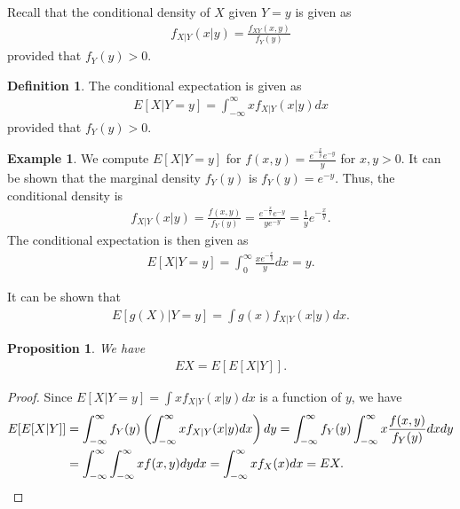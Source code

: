 \documentclass[15pt,a4paper]{book}
\newtheorem{proposition}[theorem]{Proposition}
\theoremstyle{definition}
\newtheorem{definition}[theorem]{Definition}
\newtheorem{example}[theorem]{Example}
\begin{document}
Recall that the conditional density of $X$ given $Y = y$ is given as
\begin{align*}
    f_{X|Y}(x|y) = \frac{f_{XY}(x,y)}{f_{Y}(y)}
\end{align*}
provided that $f_{Y}(y) > 0$.

\begin{definition}
    The conditional expectation is given as
    \begin{align*}
        E[X|Y=y] = \int_{-\infty}^{\infty} x f_{X|Y}(x|y) dx
    \end{align*}
    provided that $f_{Y}(y) > 0$.
\end{definition}

\begin{example}
    We compute $E[X|Y=y]$ for $f(x,y) = \frac{e^{-\frac{x}{y}}e^{-y}}{y}$ for $x,y>0$. It can be shown that the marginal density $f_{Y}(y)$ is $f_{Y}(y) = e^{-y}$. Thus, the conditional density is
    \begin{align}
        f_{X|Y}(x|y) = \frac{f(x,y)}{f_{Y}(y)} = \frac{e^{-\frac{x}{y}}e^{-y}}{y e^{-y}} = \frac{1}{y} e^{-\frac{x}{y}}.
    \end{align}
    The conditional expectation is then given as
    \begin{align*}
        E[X|Y=y] = \int_{0}^{\infty} \frac{xe^{-\frac{x}{y}}}{y} dx = y.
    \end{align*}
\end{example}

It can be shown that
\begin{align}
    E[g(X)|Y=y] = \int g(x) f_{X|Y}(x|y) dx.
\end{align}

\begin{proposition}
    We have
    \begin{align*}
        EX = E[E[X|Y]].
    \end{align*}
\end{proposition}
\begin{proof}
    Since $E[X|Y=y] = \int x f_{X|Y}(x|y) dx$ is a function of $y$, we have
    \begin{align*}
        E[E[X|Y]] &= \int_{-\infty}^{\infty} f_{Y}(y) \left(  \int_{-\infty}^{\infty} x f_{X|Y}(x|y) dx\right) dy \notag 
        = \int_{-\infty}^{\infty} f_{Y}(y) \int_{-\infty}^{\infty} x \frac{f(x,y)}{f_{Y}(y)} dx dy \\
        &= \int_{-\infty}^{\infty} \int_{-\infty}^{\infty} x f(x,y) dy dx = \int_{-\infty}^{\infty} x f_{X}(x) dx = EX.
    \end{align*}
\end{proof}
\end{document}
